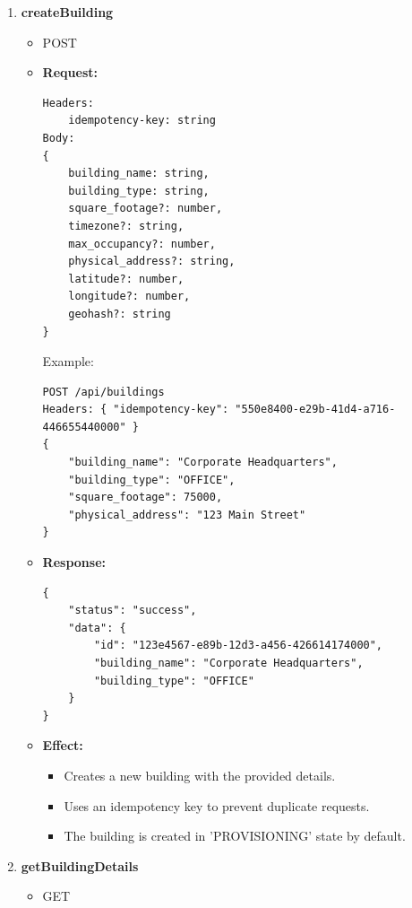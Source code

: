 \documentclass[12pt, a4paper]{article}
\begin{document}
\begin{enumerate}
\begin{itemize}
        \item \textbf{Effect:}
        \begin{itemize}
            \item Fetches all buildings assigned to the currently authenticated manager.
        \end{itemize}
    \end{itemize}
    \item \textbf{createBuilding}
    \begin{itemize}
        \item POST 
        \item \textbf{Request:}
        \begin{verbatim}
Headers:
    idempotency-key: string
Body:
{
    building_name: string,
    building_type: string,
    square_footage?: number,
    timezone?: string,
    max_occupancy?: number,
    physical_address?: string,
    latitude?: number,
    longitude?: number,
    geohash?: string
}
        \end{verbatim}
        Example:
        \begin{verbatim}
POST /api/buildings
Headers: { "idempotency-key": "550e8400-e29b-41d4-a716-446655440000" }
{
    "building_name": "Corporate Headquarters",
    "building_type": "OFFICE",
    "square_footage": 75000,
    "physical_address": "123 Main Street"
}
        \end{verbatim}
        \item \textbf{Response:}
        \begin{verbatim}
{
    "status": "success",
    "data": {
        "id": "123e4567-e89b-12d3-a456-426614174000",
        "building_name": "Corporate Headquarters",
        "building_type": "OFFICE"
    }
}
        \end{verbatim}
        \item \textbf{Effect:}
        \begin{itemize}
            \item Creates a new building with the provided details.
            \item Uses an idempotency key to prevent duplicate requests.
            \item The building is created in 'PROVISIONING' state by default.
        \end{itemize}
    \end{itemize}
    \item \textbf{getBuildingDetails}
    \begin{itemize}
        \item GET

\end{itemize}
\end{enumerate}
\end{document}
